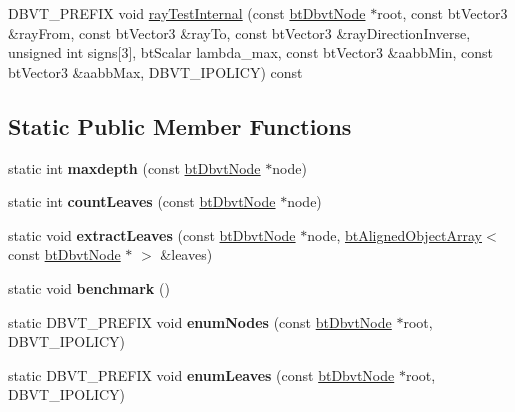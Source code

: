 \begin{DoxyCompactItemize}
\item 
D\+B\+V\+T\+\_\+\+P\+R\+E\+F\+I\+X void \hyperlink{structbt_dbvt_a9df5060e6631a1618e416f02498c0b21}{ray\+Test\+Internal} (const \hyperlink{structbt_dbvt_node}{bt\+Dbvt\+Node} $\ast$root, const bt\+Vector3 \&ray\+From, const bt\+Vector3 \&ray\+To, const bt\+Vector3 \&ray\+Direction\+Inverse, unsigned int signs\mbox{[}3\mbox{]}, bt\+Scalar lambda\+\_\+max, const bt\+Vector3 \&aabb\+Min, const bt\+Vector3 \&aabb\+Max, D\+B\+V\+T\+\_\+\+I\+P\+O\+L\+I\+C\+Y) const 
\end{DoxyCompactItemize}
\subsection*{Static Public Member Functions}
\begin{DoxyCompactItemize}
\item 
\hypertarget{structbt_dbvt_aec8b277b3c47d6ce41334dc9758a169b}{static int {\bfseries maxdepth} (const \hyperlink{structbt_dbvt_node}{bt\+Dbvt\+Node} $\ast$node)}\label{structbt_dbvt_aec8b277b3c47d6ce41334dc9758a169b}

\item 
\hypertarget{structbt_dbvt_ab832dd26afc34769ae85242307af9825}{static int {\bfseries count\+Leaves} (const \hyperlink{structbt_dbvt_node}{bt\+Dbvt\+Node} $\ast$node)}\label{structbt_dbvt_ab832dd26afc34769ae85242307af9825}

\item 
\hypertarget{structbt_dbvt_a9535878974d63d48055d15a2ec6a290d}{static void {\bfseries extract\+Leaves} (const \hyperlink{structbt_dbvt_node}{bt\+Dbvt\+Node} $\ast$node, \hyperlink{classbt_aligned_object_array}{bt\+Aligned\+Object\+Array}$<$ const \hyperlink{structbt_dbvt_node}{bt\+Dbvt\+Node} $\ast$ $>$ \&leaves)}\label{structbt_dbvt_a9535878974d63d48055d15a2ec6a290d}

\item 
\hypertarget{structbt_dbvt_a3a00928493333d8adf3d27282c3450e4}{static void {\bfseries benchmark} ()}\label{structbt_dbvt_a3a00928493333d8adf3d27282c3450e4}

\item 
\hypertarget{structbt_dbvt_a3c2e1518e17541f83003b3c445d77b92}{static D\+B\+V\+T\+\_\+\+P\+R\+E\+F\+I\+X void {\bfseries enum\+Nodes} (const \hyperlink{structbt_dbvt_node}{bt\+Dbvt\+Node} $\ast$root, D\+B\+V\+T\+\_\+\+I\+P\+O\+L\+I\+C\+Y)}\label{structbt_dbvt_a3c2e1518e17541f83003b3c445d77b92}

\item 
\hypertarget{structbt_dbvt_a98f3809446efbf886c89429869b9e099}{static D\+B\+V\+T\+\_\+\+P\+R\+E\+F\+I\+X void {\bfseries enum\+Leaves} (const \hyperlink{structbt_dbvt_node}{bt\+Dbvt\+Node} $\ast$root, D\+B\+V\+T\+\_\+\+I\+P\+O\+L\+I\+C\+Y)}\label{structbt_dbvt_a98f3809446efbf886c89429869b9e099}


\end{DoxyCompactItemize}
